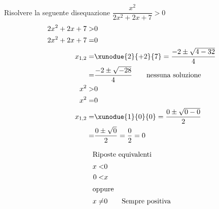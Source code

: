 		Risolvere la seguente disequazione $\dfrac{x^2}{2x^2+2x+7}> 0$
	\begin{align*}
	2x^2+2x+7>&0\\
	2x^2+2x+7=&0\\
	x_{1,2}=&\xunodue{2}{+2}{7}=\dfrac{-2\pm\sqrt{4-32}}{4}\\
	=&\dfrac{-2\pm\sqrt{-28}}{4}
	\qquad\text{nessuna soluzione}\\
	x^2>&0\\
	x^2=&0\\
	x_{1,2}=&\xunodue{1}{0}{0}=\dfrac{0\pm\sqrt{0-0}}{2}\\
	=&\dfrac{0\pm\sqrt{0}}{2}=\dfrac{0}{2}=0\\
	\end{align*}
	\begin{center}
		
	\end{center}	
		\begin{align*}
		\intertext{Riposte equivalenti}
		x<&0\\ 0<&x\\
		\intertext{oppure}
		x\neq&0\qquad\text{Sempre positiva}
		\end{align*}
